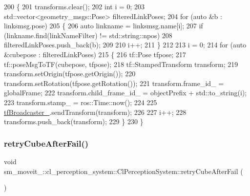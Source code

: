 \begin{DoxyCode}
200             \{
201                 transforms.clear();
202                 \textcolor{keywordtype}{int} i = 0;
203                 std::vector<geometry\_msgs::Pose> filteredLinkPoses;
204                 \textcolor{keywordflow}{for} (\textcolor{keyword}{auto} &b : linksmsg.pose)
205                 \{
206                     \textcolor{keyword}{auto} linkname = linksmsg.name[i];
207                     \textcolor{keywordflow}{if} (linkname.find(linkNameFilter) != std::string::npos)
208                         filteredLinkPoses.push\_back(b);
209 
210                     i++;
211                 \}
212 
213                 i = 0;
214                 \textcolor{keywordflow}{for} (\textcolor{keyword}{auto} &cubepose : filteredLinkPoses)
215                 \{
216                     tf::Pose tfpose;
217                     tf::poseMsgToTF(cubepose, tfpose);
218                     tf::StampedTransform transform;
219                     transform.setOrigin(tfpose.getOrigin());
220                     transform.setRotation(tfpose.getRotation());
221                     transform.frame\_id\_ = globalFrame;
222                     transform.child\_frame\_id\_ = objectPrefix + std::to\_string(i);
223                     transform.stamp\_ = ros::Time::now();
224 
225                     \hyperlink{classsm__moveit__4_1_1cl__perception__system_1_1ClPerceptionSystem_a3ba2d336b66528d18312d8ad0c4a15a6}{tfBroadcaster\_}.sendTransform(transform);
226 
227                     i++;
228                     transforms.push\_back(transform);
229                 \}
230             \}
\end{DoxyCode}
\mbox{\label{classsm__moveit__4_1_1cl__perception__system_1_1ClPerceptionSystem_a060df4809e44b378878819c884e86fb8}} 
\subsubsection{\texorpdfstring{retry\+Cube\+After\+Fail()}{retryCubeAfterFail()}}
{\footnotesize\ttfamily void sm\+\_\+moveit\+\_\+::cl\+\_\+perception\+\_\+system\+::\+Cl\+Perception\+System\+::retry\+Cube\+After\+Fail (\begin{DoxyParamCaption}{ }\end{DoxyParamCaption})\hspace{0.3cm}{\ttfamily [inline]}}



